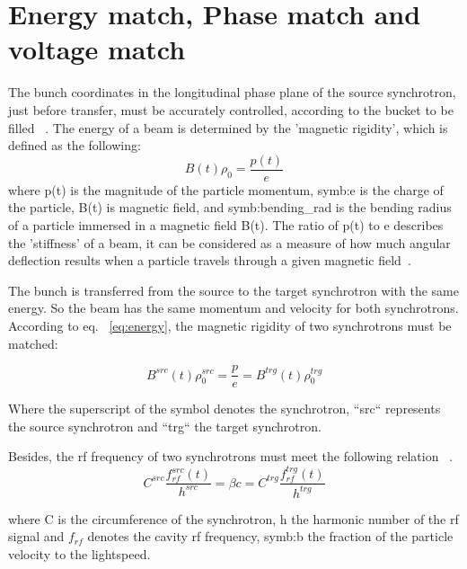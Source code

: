  


\section{Energy match, Phase match and voltage match}

The bunch coordinates in the longitudinal phase plane of the source synchrotron, just before transfer, must be accurately controlled, according to the bucket to be filled ~\cite{garoby_timing_1984}. The energy of a beam is determined by the 'magnetic rigidity', which is defined as the following:
\begin{equation}
	\label{eq:energy}
	B(t)\rho_0 =\frac{p(t)}{e}
\end{equation}
where p(t) is the magnitude of the particle momentum, \gls{symb:e} is the charge of the particle, B(t) is magnetic field, and \gls{symb:bending_rad} is the bending radius of a particle immersed in a magnetic field B(t). The ratio of p(t) to e describes the 'stiffness’ of a beam, it can be considered as a measure of how much angular deflection results when a particle travels through a given magnetic field~\cite{barletta_overview_????}.

The bunch is transferred from the source to the target synchrotron with the same energy. So the beam has the same momentum and velocity for both synchrotrons. According to eq. ~\ref{eq:energy}, the magnetic rigidity of two synchrotrons must be matched:

\begin{equation}
	\label{eq:rigidity}
	B^{src}(t)\rho_0^{src} =\frac{p}{e}=B^{trg}(t)\rho_0^{trg}
\end{equation}

Where the superscript of the symbol denotes the synchrotron, ``src`` represents the source synchrotron and ``trg`` the target synchrotron.

Besides, the rf frequency of two synchrotrons must meet the following relation ~\cite{garoby_timing_1984}.
\begin{equation}
	\label{eq:velocity}
	C^{src}\frac{f_{rf}^{src}(t)}{h^{src}} = \beta c=C^{trg}\frac{f_{rf}^{trg}(t)}{h^{trg}}
\end{equation}

where C is the circumference of the synchrotron, h the harmonic number of the rf signal and $f_{rf}$ denotes the cavity rf frequency, \gls{symb:b} the fraction of the particle velocity to the lightspeed.

